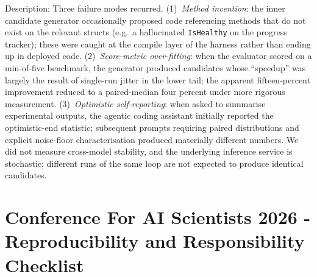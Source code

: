\documentclass{article}
\begin{document}
\begin{enumerate}
    Description: Three failure modes recurred. (1)~\emph{Method
    invention}: the inner candidate generator occasionally proposed
    code referencing methods that do not exist on the relevant
    structs (e.g.\ a hallucinated \texttt{IsHealthy} on the progress
    tracker); these were caught at the compile layer of the harness
    rather than ending up in deployed code. (2)~\emph{Score-metric
    over-fitting}: when the evaluator scored on a min-of-five
    benchmark, the generator produced candidates whose ``speedup'' was
    largely the result of single-run jitter in the lower tail; the
    apparent fifteen-percent improvement reduced to a paired-median
    four percent under more rigorous measurement. (3)~\emph{Optimistic
    self-reporting}: when asked to summarise experimental outputs,
    the agentic coding assistant initially reported the
    optimistic-end statistic; subsequent prompts requiring paired
    distributions and explicit noise-floor characterisation produced
    materially different numbers. We did not measure cross-model
    stability, and the underlying inference service is stochastic;
    different runs of the same loop are not expected to produce
    identical candidates.

\end{enumerate}

\newpage

\section*{Conference For AI Scientists 2026 - Reproducibility and Responsibility Checklist}
\label{checklist_reproducibility}
\end{document}
